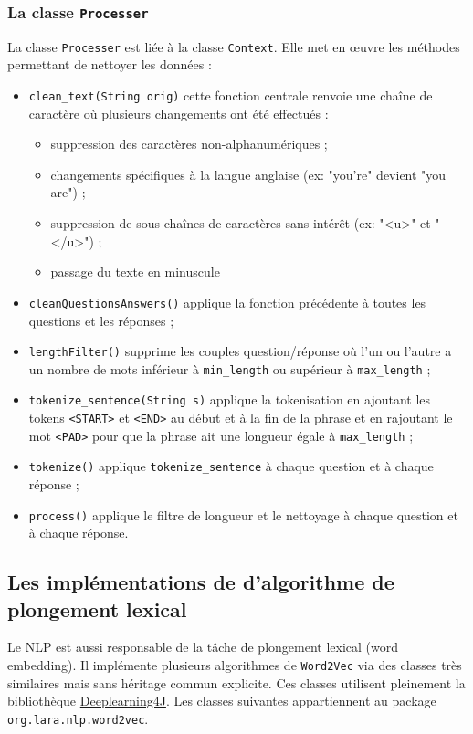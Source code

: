 \documentclass[10pt,a4paper]{article}
\begin{document}
\subsubsection{La classe \texttt{Processer}}
La classe \texttt{Processer} est liée à la classe \texttt{Context}. Elle met en œuvre les méthodes permettant de nettoyer les données :
\begin{itemize}
\item \texttt{clean\_text(String orig)} cette fonction centrale renvoie une chaîne de caractère où plusieurs changements ont été effectués :
\begin{itemize}
\item suppression des caractères non-alphanumériques ;
\item changements spécifiques à la langue anglaise (ex: "you're" devient "you are") ;
\item suppression de sous-chaînes de caractères sans intérêt (ex: "<u>" et "</u>") ;
\item passage du texte en minuscule
\end{itemize}
\item \texttt{cleanQuestionsAnswers()} applique la fonction précédente à toutes les questions et les réponses ;
\item \texttt{lengthFilter()} supprime les couples question/réponse où l'un ou l'autre a un nombre de mots inférieur à \texttt{min\_length} ou supérieur à \texttt{max\_length} ;
\item \texttt{tokenize\_sentence(String s)} applique la tokenisation en ajoutant les tokens \texttt{<START>} et \texttt{<END>} au début et à la fin de la phrase et en rajoutant le mot \texttt{<PAD>} pour que la phrase ait une longueur égale à \texttt{max\_length} ;
\item \texttt{tokenize()} applique \texttt{tokenize\_sentence} à chaque question et à chaque réponse ;
\item \texttt{process()} applique le filtre de longueur et le nettoyage à chaque question et à chaque réponse.
\end{itemize}
\subsection{Les implémentations de d'algorithme de plongement lexical}
Le NLP est aussi responsable de la tâche de plongement lexical (word embedding). Il implémente plusieurs algorithmes de \texttt{Word2Vec} via des classes très similaires mais sans héritage commun explicite. Ces classes utilisent pleinement la bibliothèque \href{https://deeplearning4j.konduit.ai/}{Deeplearning4J}. Les classes suivantes appartiennent au package \texttt{org.lara.nlp.word2vec}.
\end{document}
